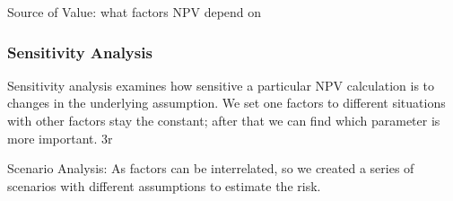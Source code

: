 \documentclass[10pt, a4paper]{article}
\begin{document}
        Source of Value: what factors NPV depend on

        \subsubsection{Sensitivity Analysis} 
            Sensitivity analysis examines how sensitive a particular NPV calculation is to changes in the underlying assumption. We set one factors to different situations with other factors stay the constant; after that we can find which parameter is more important. 3r

            Scenario Analysis: As factors can be interrelated, so we created a series of scenarios with different assumptions to estimate the risk. 
\end{document}
